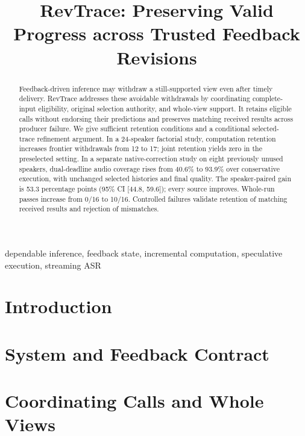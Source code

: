 \documentclass[conference,10pt]{IEEEtran}
\begin{document}
\title{RevTrace: Preserving Valid Progress across Trusted Feedback Revisions}
\author{}
\maketitle
\begin{abstract}
Feedback-driven inference may withdraw a still-supported view even after
timely delivery. RevTrace addresses these avoidable withdrawals by
coordinating complete-input eligibility, original selection authority,
and whole-view support. It retains eligible calls without endorsing their
predictions and preserves matching received results across producer
failure. We give sufficient retention conditions and a conditional
selected-trace refinement argument. In a 24-speaker factorial study,
computation retention increases frontier withdrawals from 12 to 17;
joint retention yields zero in the preselected setting. In a separate
native-correction study on eight previously unused speakers,
dual-deadline audio coverage rises from 40.6\% to 93.9\% over conservative
execution, with unchanged selected histories and final quality.
The speaker-paired gain is 53.3 percentage points (95\% CI [44.8, 59.6]);
every source improves. Whole-run passes increase from 0/16 to 10/16.
Controlled failures validate retention of matching received results and
rejection of mismatches.
\end{abstract}
\begin{IEEEkeywords}
dependable inference, feedback state, incremental computation, speculative execution, streaming ASR
\end{IEEEkeywords}
\section{Introduction}\label{sec:intro}

\section{System and Feedback Contract}\label{sec:contract}

\section{Coordinating Calls and Whole Views}\label{sec:continuation}





\end{document}
